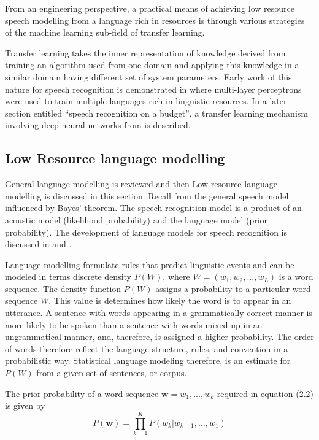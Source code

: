 From an engineering perspective, a practical means of achieving low resource speech modelling from a language rich in resources is through various strategies of the machine learning sub-field of transfer learning.  

Transfer learning takes the inner representation of knowledge derived from training an algorithm used from one domain and applying this knowledge in a similar domain having different set of system parameters. Early work of this nature for speech recognition is demonstrated in \citep{vu2013multilingual} where multi-layer perceptrons were used to train multiple languages rich in linguistic resources. In a later section entitled “speech recognition on a budget”, a transfer learning mechanism involving deep neural networks from \citep{kunze2017transfer} is described.

\subsection{Low Resource language modelling} \label{sec_lrlm}

General language modelling is reviewed and then Low resource language modelling is discussed in this section. Recall from the general speech model influenced by Bayes' theorem.  The speech recognition model is a product of an acoustic model (likelihood probability) and the language model (prior probability).  The development of  language models for speech recognition is discussed in \cite{juang2000automatic} and \cite{1996YoungA}. 

Language modelling formulate rules that predict linguistic events and can be modeled in terms discrete density $P(W)$, where  $W=(w_1, w_2,..., w_L)$ is a word sequence. The density function $P(W)$ assigns a probability to a particular word sequence $W$.  This value is determines how likely the word is to appear in an utterance. A sentence with words appearing in a grammatically correct manner is more likely to be spoken than a sentence with words mixed up in an ungrammatical manner, and, therefore, is assigned a higher probability. The order of words therefore reflect the language structure, rules, and convention in a probabilistic way. Statistical language modeling therefore, is an estimate for $P(W)$ from a given set of sentences, or corpus.

The prior probability of a word sequence $\mathbf{w}=w_1,\dots,w_k$ required in equation (2.2) is given by
\begin{equation}P(\mathbf{w})=\prod_{k=1}^KP(w_k|w_{k-1},\dots,w_1)
\label{eqn_c2_lm01}
\end{equation}

